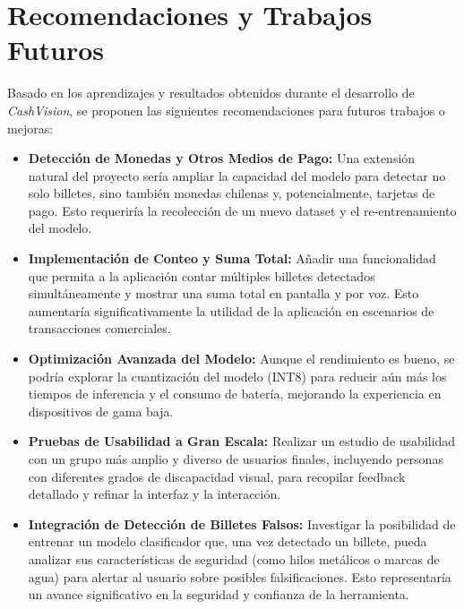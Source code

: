 \documentclass[10pt,a4paper]{report}
\begin{document}
\chapter{Recomendaciones y Trabajos Futuros}
Basado en los aprendizajes y resultados obtenidos durante el desarrollo de \textit{CashVision}, se proponen las siguientes recomendaciones para futuros trabajos o mejoras:

\begin{itemize}
    \item \textbf{Detección de Monedas y Otros Medios de Pago:} Una extensión natural del proyecto sería ampliar la capacidad del modelo para detectar no solo billetes, sino también monedas chilenas y, potencialmente, tarjetas de pago. Esto requeriría la recolección de un nuevo dataset y el re-entrenamiento del modelo.
    
    \item \textbf{Implementación de Conteo y Suma Total:} Añadir una funcionalidad que permita a la aplicación contar múltiples billetes detectados simultáneamente y mostrar una suma total en pantalla y por voz. Esto aumentaría significativamente la utilidad de la aplicación en escenarios de transacciones comerciales.
    
    \item \textbf{Optimización Avanzada del Modelo:} Aunque el rendimiento es bueno, se podría explorar la cuantización del modelo (INT8) para reducir aún más los tiempos de inferencia y el consumo de batería, mejorando la experiencia en dispositivos de gama baja.
    
    \item \textbf{Pruebas de Usabilidad a Gran Escala:} Realizar un estudio de usabilidad con un grupo más amplio y diverso de usuarios finales, incluyendo personas con diferentes grados de discapacidad visual, para recopilar feedback detallado y refinar la interfaz y la interacción.
    
    \item \textbf{Integración de Detección de Billetes Falsos:} Investigar la posibilidad de entrenar un modelo clasificador que, una vez detectado un billete, pueda analizar sus características de seguridad (como hilos metálicos o marcas de agua) para alertar al usuario sobre posibles falsificaciones. Esto representaría un avance significativo en la seguridad y confianza de la herramienta.
\end{itemize}

\nocite{*}
\printbibliography[title={Bibliografía}]
\end{document}
